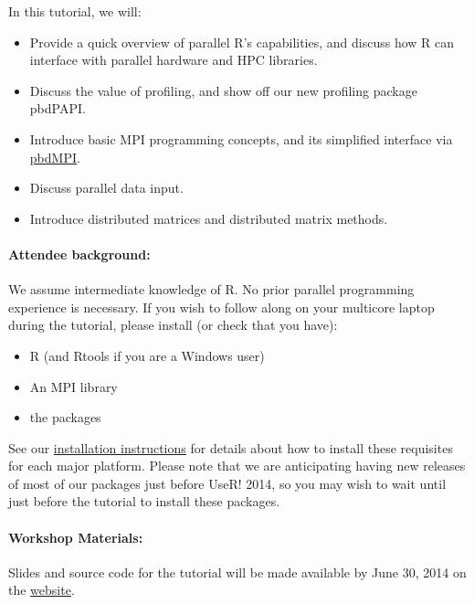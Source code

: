 \documentclass[11pt, a4paper]{article}
\newcommand{\pbdR}{%
\textbf{\color{pbdgrn}{p}\color{pbdrd}{b}\color{pbdylw}{d}\color{pbdblu}{R}}%
\xspace}
\begin{document}
In this tutorial, we will:
\begin{itemize}
  \item Provide a quick overview of parallel R's capabilities, and discuss how R 
can interface with parallel hardware and HPC libraries.
  \item Discuss the value of profiling, and show off our new profiling package 
pbdPAPI.
  \item Introduce basic MPI programming concepts, and its simplified interface 
via \href{http://cran.r-project.org/web/packages/pbdMPI/index.html}{pbdMPI}.
  \item Discuss parallel data input.
  \item Introduce distributed matrices and distributed matrix methods.
\end{itemize}


\paragraph{Attendee background:} 
We assume intermediate knowledge of R. No prior parallel programming experience 
is necessary. If you wish to follow along on your multicore laptop during the 
tutorial, please install (or check that you have):

\begin{itemize}
  \item R (and Rtools if you are a Windows user)
  \item An MPI library
  \item the \pbdR packages
\end{itemize}

See our 
\href{http://www.r-pbd.org/install.html}{installation instructions}
for details about how to install these requisites for each major platform. 
Please note that we are anticipating having new releases of most of our packages 
just before UseR! 2014, so you may wish to wait until just before the tutorial 
to install these packages.



\paragraph{Workshop Materials:}

Slides and source code for the tutorial will be made available by June
30, 2014 on the \href{http://r-pbd.org/tutorials.html}{\pbdR website}.

\end{document}
